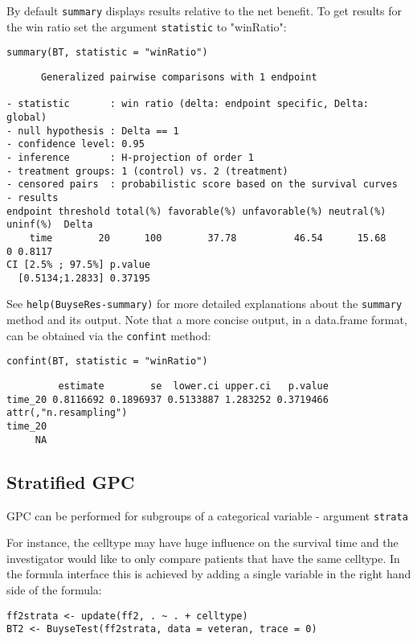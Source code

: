 \documentclass[12pt]{article}
\begin{document}
\bigskip

By default \texttt{summary} displays results relative to the net benefit. To
get results for the win ratio set the argument \texttt{statistic} to
"winRatio":
\lstset{language=r,label= ,caption= ,captionpos=b,numbers=none}
\begin{lstlisting}
summary(BT, statistic = "winRatio")
\end{lstlisting}

\begin{verbatim}
      Generalized pairwise comparisons with 1 endpoint

- statistic       : win ratio (delta: endpoint specific, Delta: global) 
- null hypothesis : Delta == 1 
- confidence level: 0.95 
- inference       : H-projection of order 1
- treatment groups: 1 (control) vs. 2 (treatment) 
- censored pairs  : probabilistic score based on the survival curves
- results
endpoint threshold total(%) favorable(%) unfavorable(%) neutral(%) uninf(%)  Delta
    time        20      100        37.78          46.54      15.68        0 0.8117
CI [2.5% ; 97.5%] p.value 
  [0.5134;1.2833] 0.37195
\end{verbatim}

See \texttt{help(BuyseRes-summary)} for more detailed explanations about the
\texttt{summary} method and its output. Note that a more concise output, in a
data.frame format, can be obtained via the \texttt{confint} method:
\lstset{language=r,label= ,caption= ,captionpos=b,numbers=none}
\begin{lstlisting}
confint(BT, statistic = "winRatio")
\end{lstlisting}

\begin{verbatim}
         estimate        se  lower.ci upper.ci   p.value
time_20 0.8116692 0.1896937 0.5133887 1.283252 0.3719466
attr(,"n.resampling")
time_20 
     NA
\end{verbatim}

\clearpage

\subsection{Stratified GPC}
\label{sec:org482544c}

GPC can be performed for subgroups of a categorical variable \hfill -
argument \texttt{strata}

\bigskip

 For instance, the celltype may have huge influence on the survival
time and the investigator would like to only compare patients that
have the same celltype. In the formula interface this is achieved by
adding a single variable in the right hand side of the formula:
\lstset{language=r,label= ,caption= ,captionpos=b,numbers=none}
\begin{lstlisting}
ff2strata <- update(ff2, . ~ . + celltype)
BT2 <- BuyseTest(ff2strata, data = veteran, trace = 0)
\end{lstlisting}
\end{document}
